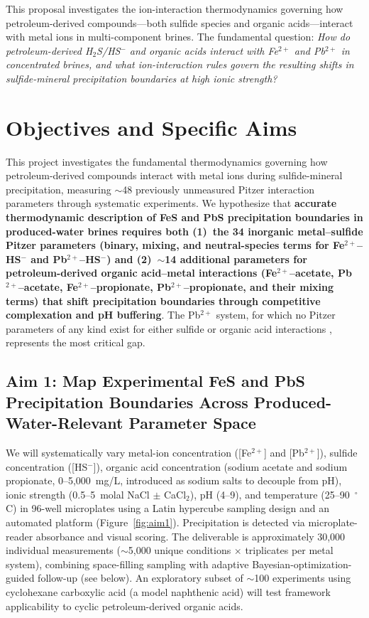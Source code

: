 \documentclass[12pt]{article}
\begin{document}
This proposal investigates the ion-interaction thermodynamics governing how petroleum-derived compounds---both sulfide species and organic acids---interact with metal ions in multi-component brines. The fundamental question: \textit{How do petroleum-derived H$_2$S/HS$^-$ and organic acids interact with Fe$^{2+}$ and Pb$^{2+}$ in concentrated brines, and what ion-interaction rules govern the resulting shifts in sulfide-mineral precipitation boundaries at high ionic strength?}

\section{Objectives and Specific Aims}

This project investigates the fundamental thermodynamics governing how petroleum-derived compounds interact with metal ions during sulfide-mineral precipitation, measuring $\sim$48 previously unmeasured Pitzer interaction parameters through systematic experiments. We hypothesize that \textbf{accurate thermodynamic description of FeS and PbS precipitation boundaries in produced-water brines requires both (1)~the 34 inorganic metal--sulfide Pitzer parameters (binary, mixing, and neutral-species terms for Fe$^{2+}$--HS$^-$ and Pb$^{2+}$--HS$^-$) and (2)~$\sim$14 additional parameters for petroleum-derived organic acid--metal interactions (Fe$^{2+}$--acetate, Pb$^{2+}$--acetate, Fe$^{2+}$--propionate, Pb$^{2+}$--propionate, and their mixing terms) that shift precipitation boundaries through competitive complexation and pH buffering}. The Pb$^{2+}$ system, for which no Pitzer parameters of any kind exist for either sulfide or organic acid interactions \cite{wang2020,felmy2000}, represents the most critical gap.

\subsection{Aim 1: Map Experimental FeS and PbS Precipitation Boundaries Across Produced-Water-Relevant Parameter Space}

We will systematically vary metal-ion concentration ([Fe$^{2+}$] and [Pb$^{2+}$]), sulfide concentration ([HS$^-$]), organic acid concentration (sodium acetate and sodium propionate, 0--5{,}000~mg/L, introduced as sodium salts to decouple from pH), ionic strength (0.5--5~molal NaCl $\pm$ CaCl$_2$), pH (4--9), and temperature (25--90~$^\circ$C) in 96-well microplates using a Latin hypercube sampling design and an automated platform (Figure~\ref{fig:aim1}). Precipitation is detected via microplate-reader absorbance and visual scoring. The deliverable is approximately 30,000 individual measurements ($\sim$5,000 unique conditions $\times$ triplicates per metal system), combining space-filling sampling with adaptive Bayesian-optimization-guided follow-up (see below). An exploratory subset of $\sim$100 experiments using cyclohexane carboxylic acid (a model naphthenic acid) will test framework applicability to cyclic petroleum-derived organic acids.
\end{document}
